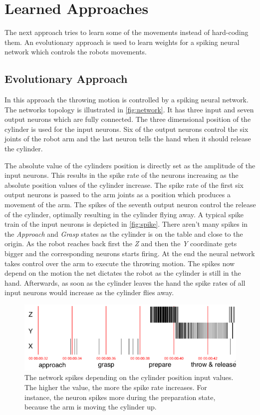 \section{Learned Approaches}
\label{sec:learned}
The next approach tries to learn some of the movements instead of hard-coding them.
An evolutionary approach is used to learn weights for a spiking neural network which controls the robots movements.

\subsection{Evolutionary Approach}
In this approach the throwing motion is controlled by a spiking neural network.
The networks topology is illustrated in \autoref{fig:network}.
It has three input and seven output neurons which are fully connected.
The three dimensional position of the cylinder is used for the input neurons.
Six of the output neurons control the six joints of the robot arm and the last neuron tells the hand when it should release the cylinder.

The absolute value of the cylinders position is directly set as the amplitude of the input neurons.
This results in the spike rate of the neurons increasing as the absolute position values of the cylinder increase.
The spike rate of the first six output neurons is passed to the arm joints as a position which produces a movement of the arm.
The spikes of the seventh output neuron control the release of the cylinder, optimally resulting in the cylinder flying away.
A typical spike train of the input neurons is depicted in \autoref{fig:spike}.
There aren't many spikes in the \textit{Approach} and \textit{Grasp} states as the cylinder is on the table and close to the origin.
As the robot reaches back first the \textit{Z} and then the \textit{Y} coordinate gets bigger and the corresponding neurons starts firing.
At the end the neural network takes control over the arm to execute the throwing motion.
The spikes now depend on the motion the net dictates the robot as the cylinder is still in the hand.
Afterwards, as soon as the cylinder leaves the hand the spike rates of all input neurons would increase as the cylinder flies away.

\begin{figure}[h]
\centering
\includegraphics[width=.95\columnwidth]{figures/spike_train.png}
\caption{The network spikes depending on the cylinder position input values. The higher the value, the more the spike rate increases. For instance, the neuron spikes more during the preparation state, because the arm is moving the cylinder up.}
\label{fig:spiketrain}
\end{figure}

